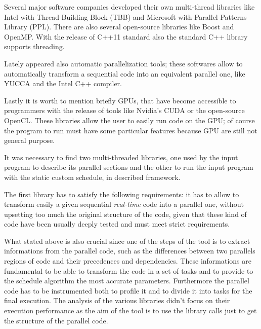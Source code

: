 \documentclass[a4paper,11pt,oneside]{book}
\begin{document}
Several major software companies developed their own multi-thread libraries like Intel with Thread Building Block (TBB) and Microsoft with Parallel Patterns Library (PPL). There are also several open-source libraries like Boost and OpenMP. With the release of C++11 standard also the standard C++ library supports threading.

Lately appeared also automatic parallelization tools; these softwares allow to automatically transform a sequential code into an equivalent parallel one, like YUCCA and the Intel C++ compiler. 

Lastly it is worth to mention briefly GPUs, that have become accessible to programmers with the release of tools like Nvidia's CUDA or the open-source OpenCL. These libraries allow the user to easily run code on the GPU; of course the program to run must have some particular features because GPU are still not general purpose. 

It was necessary to find two multi-threaded libraries, one used by the input program to describe its parallel sections and the other to run the input program with the static custom schedule, in described framework.

The first library has to satisfy the following requirements: it has to allow to transform easily a given sequential \emph{real-time} code into a parallel one, without upsetting too much the original structure of the code, given that these kind of code have been usually deeply tested and must meet strict requirements.

What stated above is also crucial since one of the steps of the tool is to extract informations from the parallel code, such as the differences between two parallels regions of code and their precedences and dependencies. These informations are fundamental to be able to transform the code in a set of tasks and to provide to the schedule algorithm the most accurate parameters. Furthermore the parallel code has to be instrumented both to profile it and to divide it into tasks for the final execution. The analysis of the various libraries didn’t focus on their execution performance as the aim of the tool is to use the library calls just to get the structure of the parallel code.
\end{document}
